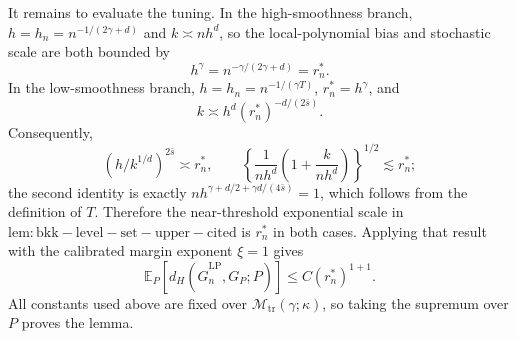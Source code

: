 It remains to evaluate the tuning. In the high-smoothness branch, \(h=h_n=n^{-1/(2\gamma+d)}\) and \(k\asymp nh^d\), so the local-polynomial bias and stochastic scale are both bounded by
\[
 h^\gamma=n^{-\gamma/(2\gamma+d)}=r_n^*.
\]
In the low-smoothness branch, \(h=h_n=n^{-1/(\gamma T)}\), \(r_n^*=h^\gamma\), and
\[
 k\asymp h^d(r_n^*)^{-d/(2\bar s)}.
\]
Consequently,
\[
 (h/k^{1/d})^{2\bar s}\asymp r_n^*,
 \qquad
 \left\{\frac1{nh^d}\left(1+\frac{k}{nh^d}\right)\right\}^{1/2}\lesssim r_n^*;
\]
the second identity is exactly \(n h^{\gamma+d/2+\gamma d/(4\bar s)}=1\), which follows from the definition of \(T\). Therefore the near-threshold exponential scale in \(\mathrm{lem:bkk-level-set-upper-cited}\) is \(r_n^*\) in both cases. Applying that result with the calibrated margin exponent \(\xi=1\) gives
\[
 \mathbb E_P[d_H(\widehat G_n^{\mathrm{LP}},G_P;P)]
 \le C(r_n^*)^{1+1}.
\]
All constants used above are fixed over \(\mathcal M_{\mathrm{tr}}(\gamma;\kappa)\), so taking the supremum over \(P\) proves the lemma.